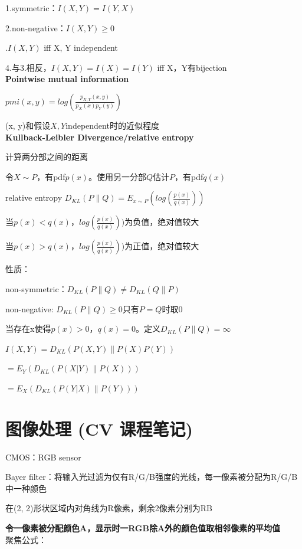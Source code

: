 \documentclass[UTF8]{ctexart}
\begin{document}
  \quad 1.symmetric：$I(X, Y) = I(Y, X)$

  \quad 2.non-negative：$I(X, Y) \geq 0$

  .$I(X, Y)$ iff X, Y independent

  \quad 4.与3.相反，$I(X, Y) = I(X) = I(Y)$ iff X，Y有bijection\\
\textbf{Pointwise mutual information}

  $pmi(x, y) = log(\frac{p_{X, Y}(x, y)}{p_X(x)p_Y(y)})$

  (x, y)和假设$X, Y$independent时的近似程度\\
\textbf{Kullback-Leibler Divergence/relative entropy}

  计算两分部之间的距离

  令$X \sim P$，有pdf$p(x)$。使用另一分部$Q$估计$P$，有pdf$q(x)$

  relative entropy $D_{KL}(P \| Q) = E_{x \sim P}(log(\frac{p(x)}{q(x)}))$

  \quad 当$p(x) < q(x)$，$log(\frac{p(x)}{q(x)}))$为负值，绝对值较大
  
  \quad 当$p(x) > q(x)$，$log(\frac{p(x)}{q(x)}))$为正值，绝对值较大

  性质：

  \quad non-symmetric：$D_{KL}(P\|Q) \neq D_{KL}(Q \| P)$

  \quad non-negative: $D_{KL}(P\|Q) \geq 0$只有$P = Q$时取0

  \quad 当存在x使得$p(x) > 0$，$q(x) = 0$。定义$D_{KL}(P\|Q) = \infty$

  \quad $I(X, Y) = D_{KL}(P(X, Y) \| P(X)P(Y))$

  \quad \quad $ = E_Y(D_{KL}(P(X | Y) \| P(X)))$

  \quad \quad $ = E_X(D_{KL}(P(Y | X) \| P(Y)))$

\section{图像处理 (CV 课程笔记)}
\noindent CMOS：RGB sensor

  Bayer filter：将输入光过滤为仅有R/G/B强度的光线，每一像素被分配为R/G/B中一种颜色

  \quad 在(2, 2)形状区域内对角线为R像素，剩余2像素分别为RB

  \textbf{令一像素被分配颜色A，显示时一RGB除A外的颜色值取相邻像素的平均值}\\
聚焦公式：
\end{document}
